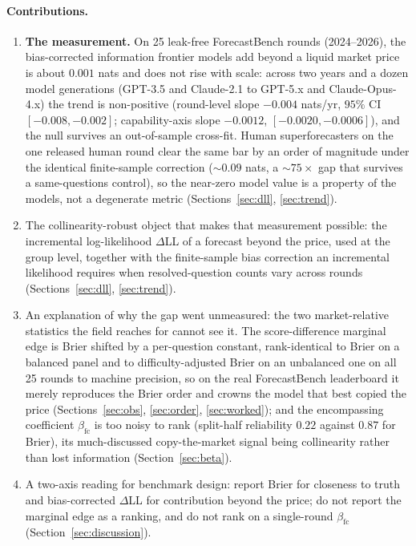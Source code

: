 \documentclass[11pt]{article}
\begin{document}
\paragraph{Contributions.}
\begin{enumerate}[leftmargin=1.4em,itemsep=2pt]
\item \textbf{The measurement.} On 25 leak-free ForecastBench rounds (2024--2026), the bias-corrected information frontier models add beyond a liquid market price is about $0.001$ nats and does not rise with scale: across two years and a dozen model generations (GPT-3.5 and Claude-2.1 to GPT-5.x and Claude-Opus-4.x) the trend is non-positive (round-level slope $-0.004$ nats/yr, $95\%$ CI $[-0.008,-0.002]$; capability-axis slope $-0.0012$, $[-0.0020,-0.0006]$), and the null survives an out-of-sample cross-fit. Human superforecasters on the one released human round clear the same bar by an order of magnitude under the identical finite-sample correction ($\sim\!0.09$ nats, a $\sim\!75\times$ gap that survives a same-questions control), so the near-zero model value is a property of the models, not a degenerate metric (Sections~\ref{sec:dll}, \ref{sec:trend}).
\item The collinearity-robust object that makes that measurement possible: the incremental log-likelihood $\Delta$LL of a forecast beyond the price, used at the group level, together with the finite-sample bias correction an incremental likelihood requires when resolved-question counts vary across rounds (Sections~\ref{sec:dll}, \ref{sec:trend}).
\item An explanation of why the gap went unmeasured: the two market-relative statistics the field reaches for cannot see it. The score-difference marginal edge is Brier shifted by a per-question constant, rank-identical to Brier on a balanced panel and to difficulty-adjusted Brier on an unbalanced one on all 25 rounds to machine precision, so on the real ForecastBench leaderboard it merely reproduces the Brier order and crowns the model that best copied the price (Sections~\ref{sec:obs}, \ref{sec:order}, \ref{sec:worked}); and the encompassing coefficient $\beta_{\mathrm{fc}}$ is too noisy to rank (split-half reliability $0.22$ against $0.87$ for Brier), its much-discussed copy-the-market signal being collinearity rather than lost information (Section~\ref{sec:beta}).
\item A two-axis reading for benchmark design: report Brier for closeness to truth and bias-corrected $\Delta$LL for contribution beyond the price; do not report the marginal edge as a ranking, and do not rank on a single-round $\beta_{\mathrm{fc}}$ (Section~\ref{sec:discussion}).
\end{enumerate}
\end{document}
